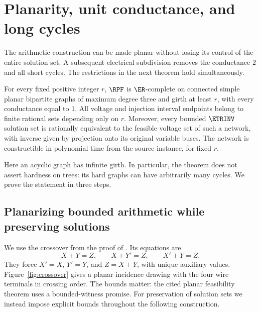 \section{Planarity, unit conductance, and long cycles}
\label{sec:structural}

The arithmetic construction can be made planar without losing its control of
the entire solution set. A subsequent electrical subdivision removes the
conductance $2$ and all short cycles. The restrictions in the next theorem
hold simultaneously.

\begin{theorem}
\label{thm:structural}
For every fixed positive integer $r$, $\RPF$ is $\ER$-complete on connected
simple planar bipartite graphs of maximum degree three and girth at least
$r$, with every conductance equal to $1$. All voltage and injection interval
endpoints belong to finite rational sets depending only on $r$.
Moreover, every bounded $\ETRINV$ solution set is rationally equivalent to
the feasible voltage set of such a network, with inverse given by projection
onto its original variable buses. The network is constructible in polynomial
time from the source instance, for fixed $r$.
\end{theorem}

Here an acyclic graph has infinite girth. In particular, the theorem does not
assert hardness on trees: its hard graphs can have arbitrarily many cycles.
We prove the statement in three steps.

\subsection{Planarizing bounded arithmetic while preserving solutions}

We use the crossover from the proof of
\citet[Theorem 2.1 and Figure 3]{DobbinsEtAl2023}. Its equations are
\begin{equation}
 X+Y=Z,\qquad X+Y'=Z,\qquad X'+Y=Z.
 \label{eq:crossover}
\end{equation}
They force $X'=X$, $Y'=Y$, and $Z=X+Y$, with unique auxiliary values.
Figure~\ref{fig:crossover} gives a planar incidence drawing with the four
wire terminals in crossing order. The bounds matter: the cited planar
feasibility theorem uses a bounded-witness promise. For preservation of
solution sets we instead impose explicit bounds throughout the following
construction.

